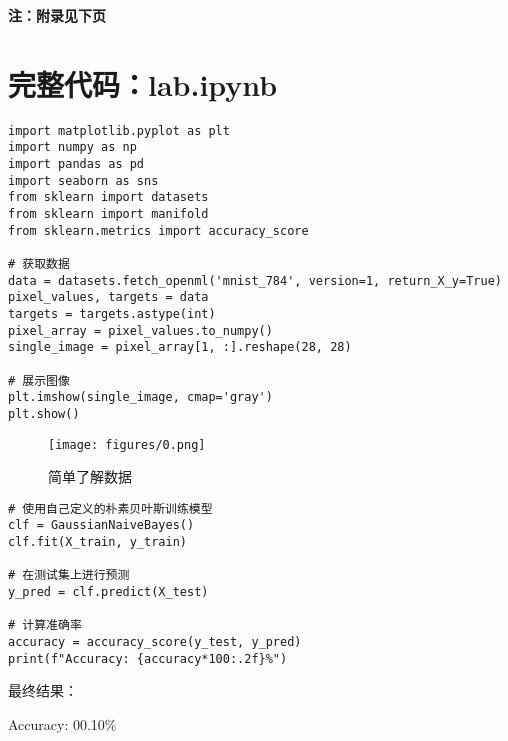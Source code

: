 \documentclass[12pt]{article}
\begin{document}
\vspace*{\fill}
\begin{center}
    \textbf{注：附录见下页}
\end{center}
\vspace*{\fill}

\clearpage  %

\newpage
\appendix

\section*{完整代码：lab.ipynb}
\begin{verbatim}
import matplotlib.pyplot as plt
import numpy as np
import pandas as pd
import seaborn as sns
from sklearn import datasets
from sklearn import manifold
from sklearn.metrics import accuracy_score

# 获取数据
data = datasets.fetch_openml('mnist_784', version=1, return_X_y=True)
pixel_values, targets = data
targets = targets.astype(int)
pixel_array = pixel_values.to_numpy()
single_image = pixel_array[1, :].reshape(28, 28)

# 展示图像
plt.imshow(single_image, cmap='gray')
plt.show()
\end{verbatim}

\begin{figure}[H]
    \centering
    \hspace*{-1.4cm}
    \texttt{[image: figures/0.png]}
    \caption{简单了解数据}
    \label{fig:your_label}
\end{figure}

\begin{verbatim}
# 使用自己定义的朴素贝叶斯训练模型
clf = GaussianNaiveBayes()
clf.fit(X_train, y_train)

# 在测试集上进行预测
y_pred = clf.predict(X_test)

# 计算准确率
accuracy = accuracy_score(y_test, y_pred)
print(f"Accuracy: {accuracy*100:.2f}%")
\end{verbatim}

最终结果：

Accuracy: 00.10\%
\end{document}
